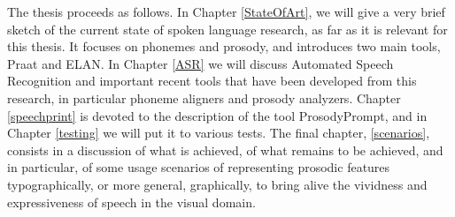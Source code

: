 The thesis proceeds as follows. In Chapter \ref{StateOfArt}, we will give a very brief sketch of the current state of spoken language research, as far as it is relevant for this thesis. It focuses on phonemes and prosody, and introduces two main tools, Praat and ELAN. In Chapter \ref{ASR} we will discuss Automated Speech Recognition and important recent tools that have been developed from this research, in particular phoneme aligners and prosody analyzers. Chapter \ref{speechprint} is devoted to the description of the tool ProsodyPrompt, and in Chapter \ref{testing} we will put it to various tests. The final chapter, \ref{scenarios}, consists in a discussion of what is achieved, of what remains to be achieved, and in particular, of some usage scenarios of representing prosodic features typographically, or more general, graphically, to bring alive the vividness and expressiveness of speech in the visual domain. 






